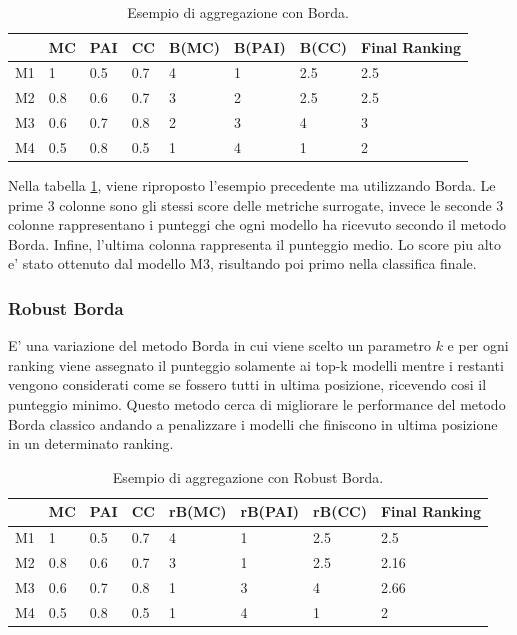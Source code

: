 \begin{table}
	
	\centering
	\begin{tabular}{|l|l|l|l|l|l|l|l|}
		\hline
		   & MC  & PAI & CC  & B(MC) & B(PAI) & B(CC) & Final Ranking \\ \hline
		M1 & 1   & 0.5 & 0.7 & 4     & 1      & 2.5   & 2.5           \\ \hline
		M2 & 0.8 & 0.6 & 0.7 & 3     & 2      & 2.5   & 2.5           \\ \hline
		M3 & 0.6 & 0.7 & 0.8 & 2     & 3      & 4     & 3             \\ \hline
		M4 & 0.5 & 0.8 & 0.5 & 1     & 4      & 1     & 2             \\ \hline
	\end{tabular}
	\caption{\label{borda}Esempio di aggregazione con Borda.}
\end{table}


Nella tabella \ref{borda}, viene riproposto l'esempio precedente ma utilizzando Borda. Le prime 3 colonne sono gli stessi score delle metriche surrogate, invece le seconde 3 colonne rappresentano i punteggi che ogni modello ha ricevuto secondo il metodo Borda. Infine, l'ultima colonna rappresenta il punteggio medio. Lo score piu alto e' stato ottenuto dal modello M3, risultando poi primo nella classifica finale.
\subsubsection{Robust Borda}
E' una variazione del metodo Borda in cui viene scelto un parametro $k$ e per ogni ranking viene assegnato il punteggio solamente ai top-k modelli mentre i restanti vengono considerati come se fossero tutti in ultima posizione, ricevendo cosi il punteggio minimo. Questo metodo cerca di migliorare le performance del metodo Borda classico andando a penalizzare i modelli che finiscono in ultima posizione in un determinato ranking. 

\begin{table}
	
	\centering
	\begin{tabular}{|l|l|l|l|l|l|l|l|}
		\hline
		   & MC  & PAI & CC  & rB(MC) & rB(PAI) & rB(CC) & Final Ranking \\ \hline
		M1 & 1   & 0.5 & 0.7 & 4      & 1       & 2.5    & 2.5           \\ \hline
		M2 & 0.8 & 0.6 & 0.7 & 3      & 1       & 2.5    & 2.16          \\ \hline
		M3 & 0.6 & 0.7 & 0.8 & 1      & 3       & 4      & 2.66          \\ \hline
		M4 & 0.5 & 0.8 & 0.5 & 1      & 4       & 1      & 2             \\ \hline
	\end{tabular}
	\caption{\label{rborda}Esempio di aggregazione con Robust Borda.}
\end{table}

